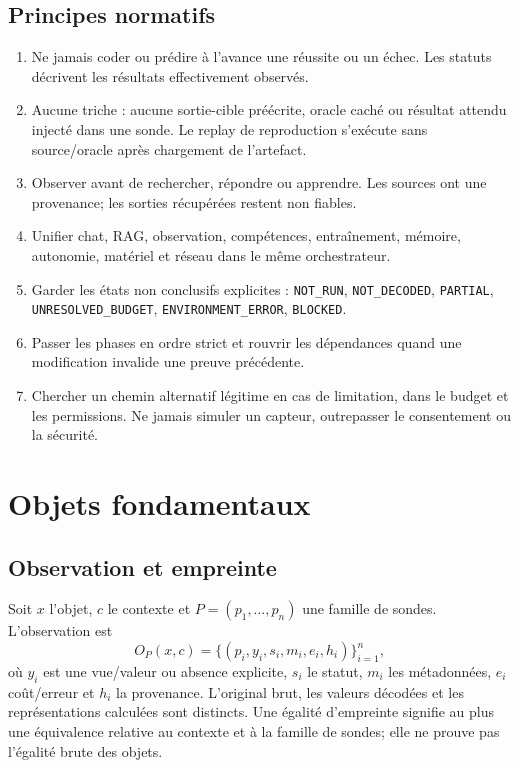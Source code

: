 \documentclass[11pt,a4paper]{report}
\begin{document}
\section{Principes normatifs}
\begin{enumerate}
\item Ne jamais coder ou prédire à l'avance une réussite ou un échec. Les statuts décrivent les résultats effectivement observés.
\item Aucune triche : aucune sortie-cible préécrite, oracle caché ou résultat attendu injecté dans une sonde. Le replay de reproduction s'exécute sans source/oracle après chargement de l'artefact.
\item Observer avant de rechercher, répondre ou apprendre. Les sources ont une provenance; les sorties récupérées restent non fiables.
\item Unifier chat, RAG, observation, compétences, entraînement, mémoire, autonomie, matériel et réseau dans le même orchestrateur.
\item Garder les états non conclusifs explicites : \texttt{NOT\_RUN}, \texttt{NOT\_DECODED}, \texttt{PARTIAL}, \texttt{UNRESOLVED\_BUDGET}, \texttt{ENVIRONMENT\_ERROR}, \texttt{BLOCKED}.
\item Passer les phases en ordre strict et rouvrir les dépendances quand une modification invalide une preuve précédente.
\item Chercher un chemin alternatif légitime en cas de limitation, dans le budget et les permissions. Ne jamais simuler un capteur, outrepasser le consentement ou la sécurité.
\end{enumerate}

\chapter{Objets fondamentaux}
\section{Observation et empreinte}Soit $x$ l'objet, $c$ le contexte et $P=(p_1,\ldots,p_n)$ une famille de sondes. L'observation est
\[
 O_P(x,c)=\{(p_i,y_i,s_i,m_i,e_i,h_i)\}_{i=1}^n,
\]
où $y_i$ est une vue/valeur ou absence explicite, $s_i$ le statut, $m_i$ les métadonnées, $e_i$ coût/erreur et $h_i$ la provenance. L'original brut, les valeurs décodées et les représentations calculées sont distincts. Une égalité d'empreinte signifie au plus une équivalence relative au contexte et à la famille de sondes; elle ne prouve pas l'égalité brute des objets.
\end{document}
